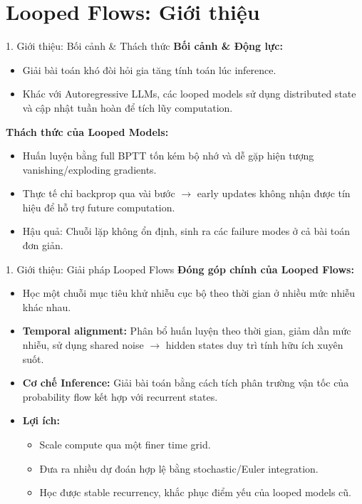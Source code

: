 \section{Looped Flows: Giới thiệu}
\begin{frame}{1. Giới thiệu: Bối cảnh \& Thách thức}
    \textbf{Bối cảnh \& Động lực:}
    \begin{itemize}
        \item Giải bài toán khó đòi hỏi gia tăng tính toán lúc inference.
        \item Khác với Autoregressive LLMs, các looped models sử dụng distributed state và cập nhật tuần hoàn để tích lũy computation.
    \end{itemize}
    \vspace{0.3cm}
    \textbf{Thách thức của Looped Models:}
    \begin{itemize}
        \item Huấn luyện bằng full BPTT tốn kém bộ nhớ và dễ gặp hiện tượng vanishing/exploding gradients.
        \item Thực tế chỉ backprop qua vài bước $\rightarrow$ early updates không nhận được tín hiệu để hỗ trợ future computation.
        \item Hậu quả: Chuỗi lặp không ổn định, sinh ra các failure modes ở cả bài toán đơn giản.
    \end{itemize}
\end{frame}

\begin{frame}{1. Giới thiệu: Giải pháp Looped Flows}
    \textbf{Đóng góp chính của Looped Flows:}
    \begin{itemize}
        \item Học một chuỗi mục tiêu khử nhiễu cục bộ theo thời gian ở nhiều mức nhiễu khác nhau.
        \item \textbf{Temporal alignment:} Phân bổ huấn luyện theo thời gian, giảm dần mức nhiễu, sử dụng shared noise $\rightarrow$ hidden states duy trì tính hữu ích xuyên suốt.
        \item \textbf{Cơ chế Inference:} Giải bài toán bằng cách tích phân trường vận tốc của probability flow kết hợp với recurrent states.
        \item \textbf{Lợi ích:}
        \begin{itemize}
            \item Scale compute qua một finer time grid.
            \item Đưa ra nhiều dự đoán hợp lệ bằng stochastic/Euler integration.
            \item Học được stable recurrency, khắc phục điểm yếu của looped models cũ.
        \end{itemize}
    \end{itemize}
\end{frame}

